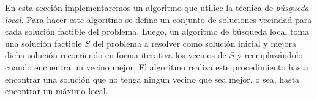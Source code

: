 En esta sección implementaremos un algoritmo que utilice la técnica de \emph{búsqueda local}. Para hacer este algoritmo se define un conjunto de soluciones vecindad para cada solución factible del problema. Luego, un algoritmo de búsqueda local toma una solución factible $S$ del problema a resolver como solución inicial y mejora dicha solución recorriendo en forma iterativa los vecinos de $S$ y reemplazándolo cuando encuentra un vecino mejor. El algoritmo realiza este procedimiento hasta encontrar una solución que no tenga ningún vecino que sea mejor, o sea, hasta encontrar un máximo local.